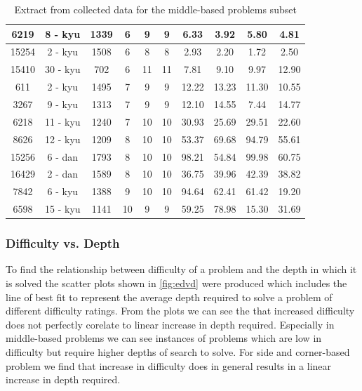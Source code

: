 \documentclass{l4proj}
\begin{document}
\begin{table}[!ht]
\begin{tabular}{|c|c|c|c|c|c|c|c|c|c|}
6219 & 8 - kyu & 1339 & 6 & 9 & 9 & 6.33 & 3.92 & 5.80 & 4.81 \\ \hline
15254 & 2 - kyu & 1508 & 6 & 8 & 8 & 2.93 & 2.20 & 1.72 & 2.50 \\ \hline
15410 & 30 - kyu & 702 & 6 & 11 & 11 & 7.81 & 9.10 & 9.97 & 12.90 \\ \hline
611 & 2 - kyu & 1495 & 7 & 9 & 9 & 12.22 & 13.23 & 11.30 & 10.55 \\ \hline
3267 & 9 - kyu & 1313 & 7 & 9 & 9 & 12.10 & 14.55 & 7.44 & 14.77 \\ \hline
6218 & 11 - kyu & 1240 & 7 & 10 & 10 & 30.93 & 25.69 & 29.51 & 22.60 \\ \hline
8626 & 12 - kyu & 1209 & 8 & 10 & 10 & 53.37 & 69.68 & 94.79 & 55.61 \\ \hline
15256 & 6 - dan & 1793 & 8 & 10 & 10 & 98.21 & 54.84 & 99.98 & 60.75 \\ \hline
16429 & 2 - dan & 1589 & 8 & 10 & 10 & 36.75 & 39.96 & 42.39 & 38.82 \\ \hline
7842 & 6 - kyu & 1388 & 9 & 10 & 10 & 94.64 & 62.41 & 61.42 & 19.20 \\ \hline
6598 & 15 - kyu & 1141 & 10 & 9 & 9 & 59.25 & 78.98 & 15.30 & 31.69 \\ \hline

\end{tabular}
\caption{Extract from collected data for the middle-based problems subset}
\label{table:extract-middle}
\end{table}




\subsubsection{Difficulty vs. Depth}

To find the relationship between difficulty of a problem and the depth in which it is solved the scatter plots shown in \autoref{fig:edvd} were produced which includes the line of best fit to represent the average depth required to solve a problem of different difficulty ratings. From the plots we can see the that increased difficulty does not perfectly corelate to linear increase in depth required. Especially in middle-based problems we can see instances of problems which are low in difficulty but require higher depths of search to solve. For side and corner-based problem we find that increase in difficulty does in general results in a linear increase in depth required.
\end{document}
